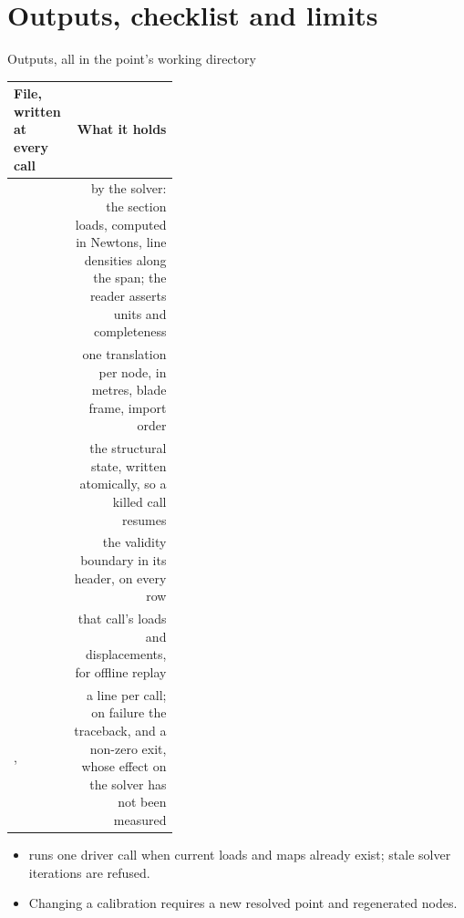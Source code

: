 %
%

\section{Outputs, checklist and limits}

\begin{frame}{Outputs, all in the point's working directory}
\relax %
{\ftstablesize\renewcommand{\arraystretch}{1.1}
\begin{tabularx}{\linewidth}{@{}P{0.36\linewidth}R@{}}
\toprule
\textbf{File, written at every call} & \textbf{What it holds} \\
\midrule
{} & by the solver: the section loads, computed in Newtons, line densities along the span; the reader asserts units and completeness \\
 & one translation per node, in metres, blade frame, import order \\
 & the structural state, written atomically, so a killed call resumes \\
 & the validity boundary in its header,  on every row \\
 & that call's loads and displacements, for offline replay \\
,  & a line per call; on failure the traceback, and a non-zero exit, whose effect on the solver has not been measured \\
\bottomrule
\end{tabularx}}
\par\vspace{1mm}
\begin{itemize}\scriptsize
  \item {} runs one driver call when
        current loads and maps already exist; stale solver iterations are refused.
  \item Changing a calibration requires a new resolved point and regenerated
        nodes.
\end{itemize}
\end{frame}


